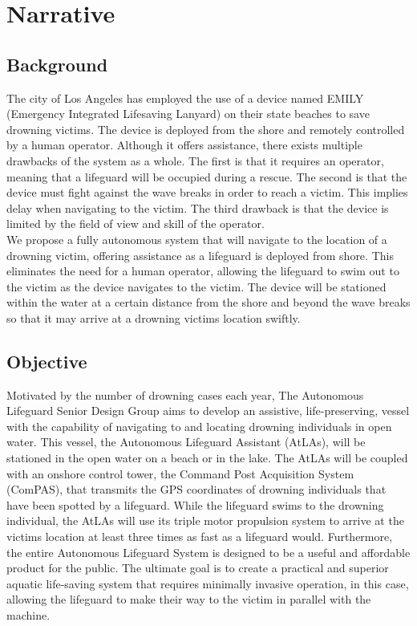 \documentclass[11pt]{article}
\begin{document}
\section*{Narrative}

\subsection*{Background}

The city of Los Angeles has employed the use of a device named EMILY (Emergency Integrated Lifesaving Lanyard) on their state beaches to save drowning victims. The device is deployed from the shore and remotely controlled by a human operator. Although it offers assistance, there exists multiple drawbacks of the system as a whole. The first is that it requires an operator, meaning that a lifeguard will be occupied during a rescue. The second is that the device must fight against the wave breaks in order to reach a victim. This implies delay when navigating to the victim. The third drawback is that the device is limited by the field of view and skill of the operator.\\

We propose a fully autonomous system that will navigate to the location of a drowning victim, offering assistance as a lifeguard is deployed from shore. This eliminates the need for a human operator, allowing the lifeguard to swim out to the victim as the device navigates to the victim. The device will be stationed within the water at a certain distance from the shore and beyond the wave breaks so that it may arrive at a drowning victims location swiftly.  

\subsection*{Objective}

Motivated by the number of drowning cases each year, The Autonomous Lifeguard Senior Design Group aims to develop an assistive, life-preserving, vessel with the capability of navigating to and locating drowning individuals in open water. This vessel, the Autonomous Lifeguard Assistant (AtLAs), will be stationed in the open water on a beach or in the lake. The AtLAs will be coupled with an onshore control tower, the Command Post Acquisition System (ComPAS), that transmits the GPS coordinates of drowning individuals that have been spotted by a lifeguard. While the lifeguard swims to the drowning individual, the AtLAs will use its triple motor propulsion system to arrive at the victims location at least three times as fast as a lifeguard would. Furthermore, the entire Autonomous Lifeguard System is designed to be a useful and affordable product for the public. The ultimate goal is to create a practical and superior aquatic life-saving system that requires minimally invasive operation, in this case, allowing the lifeguard to make their way to the victim in parallel with the machine.
\end{document}

